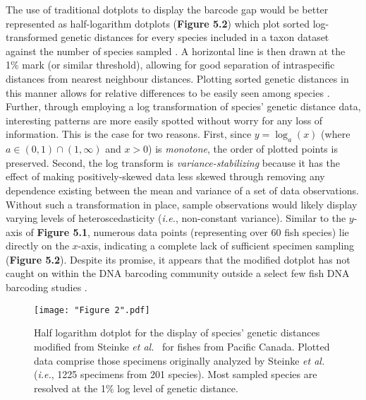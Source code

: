 The use of traditional dotplots to display the barcode gap would be better represented as half-logarithm dotplots (\textbf{Figure 5.2}) which plot sorted log-transformed genetic distances for every species included in a taxon dataset against the number of species sampled \cite{steinke2009dna, steinke2009barcoding}. A horizontal line is then drawn at the 1\% mark (or similar threshold), allowing for good separation of intraspecific distances from nearest neighbour distances. Plotting sorted genetic distances in this manner allows for relative differences to be easily seen among species \cite{steinke2009dna}. Further, through employing a log transformation of species' genetic distance data, interesting patterns are more easily spotted without worry for any loss of information. This is the case for two reasons. First, since $y = \log_{a}(x)$ (where $a \in (0, 1) \cap (1, \infty)$ and $x>0$) is \textit{monotone}, the order of plotted points is preserved. Second, the log transform is \textit{variance-stabilizing} because it has the effect of making positively-skewed data less skewed through removing any dependence existing between the mean and variance of a set of data observations. Without such a transformation in place, sample observations would likely display varying levels of heteroscedasticity (\textit{i.e.}, non-constant variance). Similar to the $y$-axis of \textbf{Figure 5.1}, numerous data points (representing over 60 fish species) lie directly on the $x$-axis, indicating a complete lack of sufficient specimen sampling (\textbf{Figure 5.2}). Despite its promise, it appears that the modified dotplot has not caught on within the DNA barcoding community outside a select few fish DNA barcoding studies \cite{steinke2009dna, steinke2009barcoding}. 

\begin{figure}[H]

\centering

\texttt{[image: "Figure 2".pdf]}

\caption[Depiction of intraspecific and interspecific genetic distances as a modified dotplot for Canadian Pacific fishes assessed by Steinke \textit{et al.}~\cite{steinke2009dna}.]{Half logarithm dotplot for the display of species' genetic distances modified from Steinke \textit{et al.}~\cite{steinke2009dna} for fishes from Pacific Canada. Plotted data comprise those specimens originally analyzed by Steinke \textit{et al.} \cite{steinke2009dna} (\textit{i.e.}, 1225 specimens from 201 species). Most sampled species are resolved at the 1\% log level of genetic distance.}

\end{figure}



